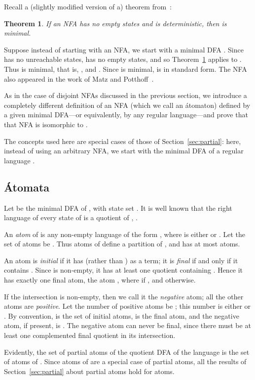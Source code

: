 \documentclass[preprint,12pt]{elsarticle}
\newtheorem{theorem}{Theorem}
\begin{document}
Recall a (slightly modified version of a) theorem from~\cite{Brz63}:
\begin{theorem}
\label{thm:Brz}
If  an NFA  has no empty states and  is deterministic, 
then  is minimal.
\end{theorem}

Suppose instead of starting with an NFA, we start with a minimal DFA . 
Since  has no unreachable states,  has no empty states, and 
so Theorem~\ref{thm:Brz} applies to . Thus 
 is minimal, that is, , and .
Since  is minimal,  is in standard form.
The NFA  also appeared in the work of Matz and Potthoff~\cite{MaPo95}.

As in the case of disjoint NFAs discussed in the previous section, we introduce a completely different definition of an NFA (which we call an \'atomaton) defined by a given minimal DFA---or equivalently, by any regular language---and prove that that NFA is isomorphic to .


The concepts used here are special cases of those of Section~\ref{sec:partial}: 
here, instead of using an arbitrary NFA, we start with the minimal DFA of a regular language .

\subsection{\'Atomata}

Let  be the minimal DFA of , with
state set .
It is well known that the right language of every state  of  
is a quotient  of , . 


An \emph{atom} of  is any non-empty language of the form 
, 
where  is either  or . 
Let the set of atoms be . 
Thus atoms of  define a partition of , and 
 has at most  atoms.

An atom is \emph{initial} if it has  (rather than ) as a term;
it is \emph{final} if and only if it contains .
Since  is non-empty, it has at least one quotient containing . 
Hence it has exactly one final atom, the atom 
, where 
 if , and  otherwise.

If the intersection 
 is non-empty, then we call it 
the \emph{negative} atom; all the other atoms are \emph{positive}. 
Let the number of positive atoms be ; this number is either  or .
By convention,  is the set of initial atoms,  is the final atom, 
and the negative atom, if present, is .
The negative atom can never be final, 
since there must be at least one complemented final quotient in its intersection.


Evidently, the set of partial atoms of the quotient DFA  of the language  is 
the set of atoms of .
Since atoms of  are a special case of partial atoms, all the results of 
Section~\ref{sec:partial} about partial atoms hold for atoms.
\end{document}
